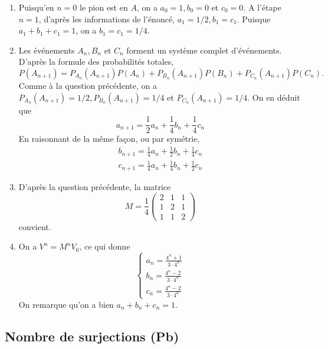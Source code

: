 \begin{correction}
\begin{enumerate}


\item  Puisqu'en $n=0$ le pion est en $A$, on a $a_{0}=1, b_{0}=0$ et $c_{0}=0 .$ A l'étape $n=1$, d'après les informations de l'énoncé, $a_{1}=1 / 2, b_{1}=c_{1}$. Puisque $a_{1}+b_{1}+c_{1}=1$, on a $b_{1}=c_{1}=1 / 4$.
\item  Les événements $A_{n}, B_{n}$ et $C_{n}$ forment un système complet d'événements. D'après la formule des probabilités totales,
$$
P\left(A_{n+1}\right)=P_{A_{n}}\left(A_{n+1}\right) P\left(A_{n}\right)+P_{B_{n}}\left(A_{n+1}\right) P\left(B_{n}\right)+P_{C_{n}}\left(A_{n+1}\right) P\left(C_{n}\right) .
$$
Comme à la question précédente, on a $P_{A_{n}}\left(A_{n+1}\right)=1 / 2, P_{B_{n}}\left(A_{n+1}\right)=1 / 4$ et $P_{C_{n}}\left(A_{n+1}\right)=1 / 4$. On en déduit que
$$
a_{n+1}=\frac{1}{2} a_{n}+\frac{1}{4} b_{n}+\frac{1}{4} c_{n}
$$
En raisonnant de la même façon, ou par symétrie,
$$
\begin{gathered}
b_{n+1}=\frac{1}{4} a_{n}+\frac{1}{2} b_{n}+\frac{1}{4} c_{n} \\
c_{n+1}=\frac{1}{4} a_{n}+\frac{1}{4} b_{n}+\frac{1}{2} c_{n}
\end{gathered}
$$
\item  D'après la question précédente, la matrice
$$
M=\frac{1}{4}\left(\begin{array}{lll}
2 & 1 & 1 \\
1 & 2 & 1 \\
1 & 1 & 2
\end{array}\right)
$$
convient.
\item  On a $V^{n}=M^{n} V_{0}$, ce qui donne
$$
\left\{\begin{array}{l}
a_{n}=\frac{4^{n}+1}{3 \cdot 4^{n}} \\
b_{n}=\frac{4^{n}-2}{3 \cdot 4^{n}} \\
c_{n}=\frac{4^{n}-2}{3 \cdot 4^{n}}
\end{array}\right.
$$
On remarque qu'on a bien $a_{n}+b_{n}+c_{n}=1$.
\end{enumerate}
\end{correction}








\subsection{Nombre de surjections (Pb)}

